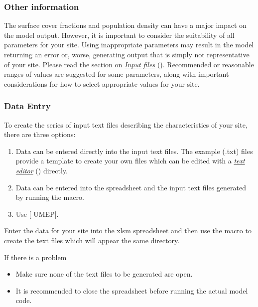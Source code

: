 \documentclass[letterpaper,10pt,english]{sphinxmanual}
\begin{document}
\subsubsection{Other information}
\label{\detokenize{prepare-to-run-the-model:other-information}}
The surface cover fractions and population density can have a major
impact on the model output. However, it is important to consider the
suitability of all parameters for your site. Using inappropriate
parameters may result in the model returning an error or, worse,
generating output that is simply not representative of your site. Please
read the section on {\hyperref[\detokenize{prepare-to-run-the-model:Input_files}]{\emph{Input files}}} (). Recommended or
reasonable ranges of values are suggested for some parameters, along
with important considerations for how to select appropriate values for
your site.


\subsubsection{Data Entry}
\label{\detokenize{prepare-to-run-the-model:data-entry}}
To create the series of input text files describing the characteristics
of your site, there are three options:
\begin{enumerate}
\item {} 
Data can be entered directly into the input text files. The example
(.txt) files provide a template to create your own files which can be
edited with a {\hyperref[\detokenize{prepare-to-run-the-model:A_text_editor}]{\emph{text editor}}} () directly.

\item {} 
Data can be entered into the spreadsheet  and
the input text files generated by running the macro.

\item {} 
Use {[}\textbar{} UMEP{]}.

\end{enumerate}

 Enter the data for your site into the xlsm
spreadsheet  and then use the macro to create the
text files which will appear the same directory.

If there is a problem
\begin{itemize}
\item {} 
Make sure none of the text files to be generated are open.

\item {} 
It is recommended to close the spreadsheet before running the actual
model code.

\end{itemize}
\end{document}
